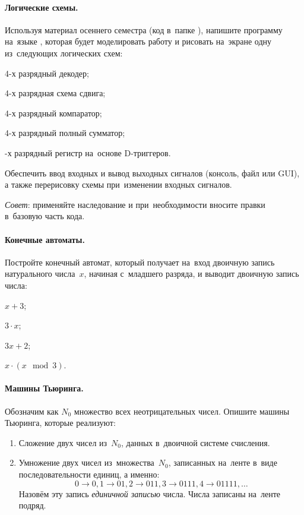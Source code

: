 \documentclass[a4paper,11pt,landscape,notitlepage,oneside,openany,final]{memoir}
\begin{document}
\paragraph{Логические схемы.}
Используя материал осеннего семестра (код в~папке ), напишите программу на~языке , которая будет моделировать работу и рисовать на~экране одну из~следующих логических схем:
\begin{enumissue}
    \item 4-х разрядный декодер;
    \item 4-х разрядная схема сдвига;
    \item 4-х разрядный компаратор;
    \item 4-х разрядный полный сумматор;
    \item{}-х разрядный регистр на~основе D-триггеров.
\end{enumissue}

\smallskip\noindent
Обеспечить ввод входных и вывод выходных сигналов (консоль, файл или GUI), а также перерисовку схемы при~изменении входных сигналов.

\smallskip\noindent
\emph{Совет}: применяйте наследование и при~необходимости вносите правки в~базовую часть кода.


\paragraph{Конечные автоматы.}
Постройте конечный автомат, который получает на~вход двоичную запись натурального числа~\(x\), начиная с~младшего разряда, и выводит двоичную запись числа:
\begin{enumissue}
    \item \(x + 3\);
    \item \(3\cdot x\);
    \item \(3x + 2\);
    \item \(x\cdot \left( x\mod 3 \right)\).
\end{enumissue}


\paragraph{Машины Тьюринга.}
Обозначим как \(N_0\) множество всех неотрицательных чисел. Опишите машины Тьюринга, которые реализуют:
\begin{enumerate}
    \item\label{task:addinuni} Сложение двух чисел из~\(N_0\), данных в~двоичной системе счисления.

    \item Умножение двух чисел из~множества~\(N_0\), записанных на~ленте в~виде последовательности единиц, а именно:
    \[
        0\rightarrow 0, 1\rightarrow 01, 2\rightarrow 011, 3\rightarrow 0111, 4\rightarrow 01111, \ldots
    \]
    Назовём эту запись \emph{единичной записью} числа. Числа записаны на~ленте подряд.
\end{enumerate}
\end{document}
